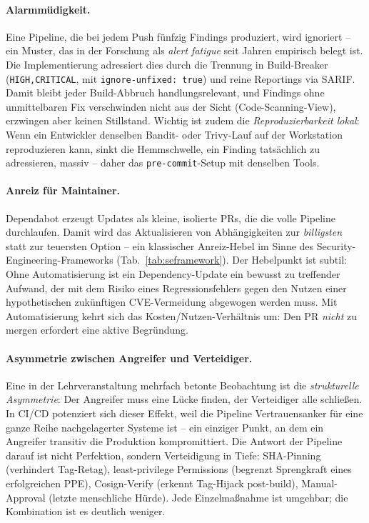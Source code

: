 \documentclass[12pt, a4paper]{scrartcl}
\begin{document}
\paragraph{Alarmmüdigkeit.}
Eine Pipeline, die bei jedem Push fünfzig Findings produziert, wird
ignoriert -- ein Muster, das in der Forschung als \emph{alert fatigue}
seit Jahren empirisch belegt ist. Die Implementierung adressiert dies
durch die Trennung in Build-Breaker (\texttt{HIGH,CRITICAL}, mit
\texttt{ignore-unfixed: true}) und reine Reportings via SARIF. Damit
bleibt jeder Build-Abbruch handlungsrelevant, und Findings ohne
unmittelbaren Fix verschwinden nicht aus der Sicht
(Code-Scanning-View), erzwingen aber keinen Stillstand. Wichtig ist
zudem die \emph{Reproduzierbarkeit lokal}: Wenn ein Entwickler
denselben Bandit- oder Trivy-Lauf auf der Workstation reproduzieren
kann, sinkt die Hemmschwelle, ein Finding tatsächlich zu adressieren,
massiv -- daher das \texttt{pre-commit}-Setup mit denselben Tools.

\paragraph{Anreiz für Maintainer.}
Dependabot erzeugt Updates als kleine, isolierte PRs, die die volle
Pipeline durchlaufen. Damit wird das Aktualisieren von Abhängigkeiten
zur \emph{billigsten} statt zur teuersten Option -- ein klassischer
Anreiz-Hebel im Sinne des Security-Engineering-Frameworks
(Tab.~\ref{tab:seframework}). Der Hebelpunkt ist subtil: Ohne
Automatisierung ist ein Dependency-Update ein bewusst zu treffender
Aufwand, der mit dem Risiko eines Regressionsfehlers gegen den Nutzen
einer hypothetischen zukünftigen CVE-Vermeidung abgewogen werden muss.
Mit Automatisierung kehrt sich das Kosten/Nutzen-Verhältnis um: Den
PR \emph{nicht} zu mergen erfordert eine aktive Begründung.

\paragraph{Asymmetrie zwischen Angreifer und Verteidiger.}
Eine in der Lehrveranstaltung mehrfach betonte Beobachtung ist die
\emph{strukturelle Asymmetrie}: Der Angreifer muss eine Lücke finden,
der Verteidiger alle schließen. In CI/CD potenziert sich dieser
Effekt, weil die Pipeline Vertrauensanker für eine ganze Reihe
nachgelagerter Systeme ist -- ein einziger Punkt, an dem ein Angreifer
transitiv die Produktion kompromittiert. Die Antwort der Pipeline
darauf ist nicht Perfektion, sondern Verteidigung in Tiefe: SHA-Pinning
(verhindert Tag-Retag), least-privilege Permissions (begrenzt
Sprengkraft eines erfolgreichen PPE), Cosign-Verify (erkennt
Tag-Hijack post-build), Manual-Approval (letzte menschliche Hürde).
Jede Einzelmaßnahme ist umgehbar; die Kombination ist es deutlich
weniger.
\end{document}

